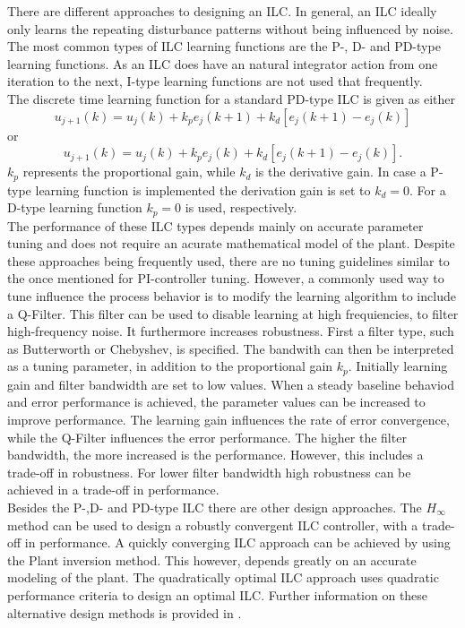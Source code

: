 There are different approaches to designing an ILC. In general, an ILC ideally only learns the repeating disturbance patterns without being influenced by noise. The most common types of ILC learning functions are the P-, D- and PD-type learning functions. As an ILC does have an natural integrator action from one iteration to the next, I-type learning functions are not used that frequently.
\\The discrete time learning function for a standard PD-type ILC is given as either
\begin{equation}
    u_{j+1}(k) = u_{j}(k)+k_{p}e_{j}(k+1)+k_{d}[e_{j}(k+1)-e_{j}(k)]
 \label{eq:PD_type}
 \end{equation}
 or
 \begin{equation}
     u_{j+1}(k) = u_{j}(k)+k_{p}e_{j}(k)+k_{d}[e_{j}(k+1)-e_{j}(k)].
  \label{eq:PD_type}
  \end{equation}
$k_{p}$ represents the proportional gain, while $k_{d}$ is the derivative gain. In case a P-type learning function is implemented the derivation gain is set to $k_{d}=0$. For a D-type learning function $k_{p}=0$ is used, respectively.
\\The performance of these ILC types depends mainly on accurate parameter tuning and does not require an acurate mathematical model of the plant. Despite these approaches being frequently used, there are no tuning guidelines similar to the once mentioned for PI-controller tuning. However, a commonly used way to tune influence the process behavior is to modify the learning algorithm to include a Q-Filter. This filter can be used to disable learning at high frequiencies, to filter high-frequency noise. It furthermore increases robustness. First a filter type, such as Butterworth or Chebyshev, is specified. The bandwith can then be interpreted as a tuning parameter, in addition to the proportional gain $k_{p}$. Initially learning gain and filter bandwidth are set to low values. When a steady baseline behaviod and error performance is achieved, the parameter values can be increased to improve performance. The learning gain influences the rate of error convergence, while the Q-Filter influences the error performance. The higher the filter bandwidth, the more increased is the performance. However, this includes a trade-off in robustness. For lower filter bandwidth high robustness can be achieved in a trade-off in performance.
\\Besides the P-,D- and PD-type ILC there are other design approaches. The $H_{\infty}$ method can be used to design a robustly convergent ILC controller, with a trade-off in performance. A quickly converging ILC approach can be achieved by using the Plant inversion method. This however, depends greatly on an accurate modeling of the plant. The quadratically optimal ILC approach uses quadratic performance criteria to design an optimal ILC. Further information on these alternative design methods is provided in \cite{ILC2}.  
